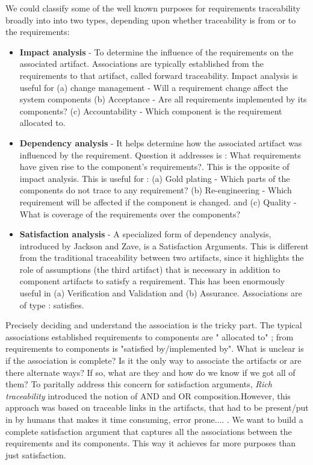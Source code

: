 We could classify some of the well known purposes for requirements traceability broadly into into two types, depending upon whether traceability is from or to the requirements: 
\begin{itemize}
  \item \textbf{Impact analysis} - To determine the influence of the requirements on the associated artifact. Associations are typically established from the requirements to that artifact, called forward traceability. Impact analysis is useful for (a) change management - Will a requirement change affect the system components (b) Acceptance - Are all requirements implemented by its components? (c) Accountability - Which component is the requirement allocated to.
  \item \textbf{Dependency analysis} -  It helps determine how the associated artifact was influenced by the requirement. Question it addresses is : What requirements have given rise to the component's requirements?. This is the opposite of impact analysis. This is useful for : (a) Gold plating - Which parts of the components do not trace to any requirement? (b) Re-engineering - Which requirement will be affected if the component is changed. and (c) Quality - What is coverage of the requirements over the components?
   \item \textbf{Satisfaction analysis} -  A specialized form of dependency analysis, introduced by Jackson and Zave, is a Satisfaction Arguments. This is different from the traditional traceability between two artifacts, since it highlights the role of assumptions (the third artifact) that is necessary in addition to component artifacts to satisfy a requirement. This has been enormously useful in (a) Verification and Validation and (b) Assurance. Associations are of type : satisfies.
\end{itemize}

Precisely deciding and understand the association is the tricky part. The typical associations established requirements to components are " allocated to" ; from requirements to components is "satisfied by/implemented by". What is unclear is if the association is complete? Is it the only way to associate the artifacts or are there alternate ways? If so, what are they and how do we know if we got all of them? To paritally address this concern for satisfaction arguments, \emph{Rich traceability} introduced the notion of AND and OR composition.However, this approach was based on traceable links in the artifacts, that had to be present/put in by humans that makes it time consuming, error prone.... . We want to build a complete satisfaction argument that captures all the associations between the requirements and its components. This way it achieves far more purposes than just satisfaction.

